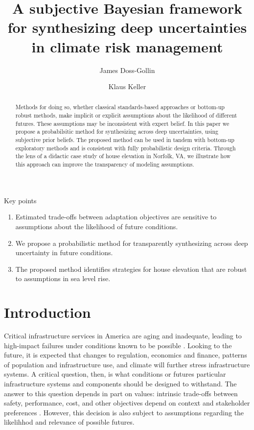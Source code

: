 \documentclass[11pt]{article}
\title{A subjective Bayesian framework for synthesizing deep uncertainties in climate risk management}
\author[1]{James Doss-Gollin}
\author[2]{Klaus Keller}
\affil[1]{Department of Civil and Environmental Engineering, Rice University}
\affil[2]{Thayer School of Engineering, Dartmouth College}
\makeatletter
\newcommand{\klaus}[1]{\todo[color=rosso, textcolor=grigio]{\textbf{ATTN Klaus:~}#1}}
\DeclareRobustCommand\onedot{\futurelet\@let@token\@onedot}
\def\@onedot{\ifx\@let@token.\else.\null\fi\xspace}
\def\eg{\emph{e.g}\onedot} \def\Eg{\emph{E.g}\onedot}
\DeclareRobustCommand\onedot{\futurelet\@let@token\@onedot}
\def\@onedot{\ifx\@let@token.\else.\null\fi\xspace}
\def\eg{\emph{e.g}\onedot} \def\Eg{\emph{E.g}\onedot}
\makeatother
\begin{document}
\maketitle
\thispagestyle{empty}

\begin{abstract}
    Methods for doing so, whether classical standards-based approaches or bottom-up robust methods, make implicit or explicit assumptions about the likelihood of different futures.
    These assumptions may be inconsistent with expert belief.
    In this paper we propose a probabilsitic method for synthesizing across deep uncertainties, using subjective prior beliefs.
    The proposed method can be used in tandem with bottom-up exploratory methods and is consistent with fully probabilistic design criteria.
    Through the lens of a didactic case study of house elevation in Norfolk, VA, we illustrate how this approach can improve the transparency of modeling assumptions.\klaus{Abstract needs a little work}
\end{abstract}

Key points
\begin{enumerate}
    \item Estimated trade-offs between adaptation objectives are sensitive to assumptions about the likelihood of future conditions.
    \item We propose a probabilistic method for transparently synthesizing across deep uncertainty in future conditions.
    \item The proposed method identifies strategies for house elevation that are robust to assumptions in sea level rise.
\end{enumerate}

\clearpage
\section{Introduction}\label{sec:introduction}

Critical infrastructure services in America are aging and inadequate, leading to high-impact failures under conditions known to be possible \citep[\eg,][]{doss-gollin_txtreme:2021,doss-gollin_fatalism:2020}.
Looking to the future, it is expected that changes to regulation, economics and finance, patterns of population and infrastructure use, and climate will further stress infrastructure systems.
A critical question, then, is what conditions or futures particular infrastructure systems and components should be designed to withstand.
The answer to this question depends in part on values: intrinsic trade-offs between safety, performance, cost, and other objectives depend on context and stakeholder preferences \citep{keller_management:2021}.
However, this decision is also subject to assumptions regarding the likelihhod and relevance of possible futures.
\end{document}
